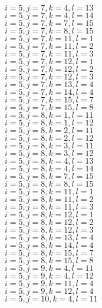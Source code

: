 \documentclass[14pt]{article}
\begin{document}
    $i=5,j=7,k=4,l=13 $ \\ 
    $i=5,j=7,k=4,l=14 $ \\ 
    $i=5,j=7,k=7,l=15 $ \\ 
    $i=5,j=7,k=8,l=15 $ \\ 
    $i=5,j=7,k=11,l=1 $ \\ 
    $i=5,j=7,k=11,l=2 $ \\ 
    $i=5,j=7,k=11,l=3 $ \\ 
    $i=5,j=7,k=12,l=1 $ \\ 
    $i=5,j=7,k=12,l=2 $ \\ 
    $i=5,j=7,k=12,l=3 $ \\ 
    $i=5,j=7,k=13,l=4 $ \\ 
    $i=5,j=7,k=14,l=4 $ \\ 
    $i=5,j=7,k=15,l=7 $ \\ 
    $i=5,j=7,k=15,l=8 $ \\ 
    $i=5,j=8,k=1,l=11 $ \\ 
    $i=5,j=8,k=1,l=12 $ \\ 
    $i=5,j=8,k=2,l=11 $ \\ 
    $i=5,j=8,k=2,l=12 $ \\ 
    $i=5,j=8,k=3,l=11 $ \\ 
    $i=5,j=8,k=3,l=12 $ \\ 
    $i=5,j=8,k=4,l=13 $ \\ 
    $i=5,j=8,k=4,l=14 $ \\ 
    $i=5,j=8,k=7,l=15 $ \\ 
    $i=5,j=8,k=8,l=15 $ \\ 
    $i=5,j=8,k=11,l=1 $ \\ 
    $i=5,j=8,k=11,l=2 $ \\ 
    $i=5,j=8,k=11,l=3 $ \\ 
    $i=5,j=8,k=12,l=1 $ \\ 
    $i=5,j=8,k=12,l=2 $ \\ 
    $i=5,j=8,k=12,l=3 $ \\ 
    $i=5,j=8,k=13,l=4 $ \\ 
    $i=5,j=8,k=14,l=4 $ \\ 
    $i=5,j=8,k=15,l=7 $ \\ 
    $i=5,j=8,k=15,l=8 $ \\ 
    $i=5,j=9,k=4,l=11 $ \\ 
    $i=5,j=9,k=4,l=12 $ \\ 
    $i=5,j=9,k=11,l=4 $ \\ 
    $i=5,j=9,k=12,l=4 $ \\ 
    $i=5,j=10,k=4,l=11 $ \\ 
\end{document}
